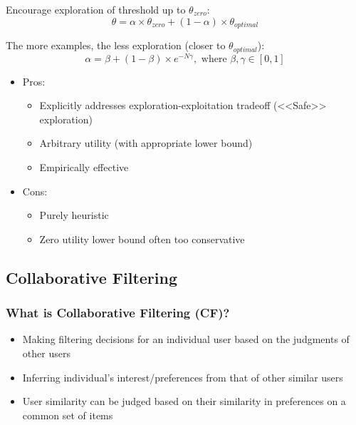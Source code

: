 Encourage exploration of threshold up to $\theta_{zero}$:
\begin{equation*}
\theta = \alpha \times \theta_{zero} + (1-\alpha) \times \theta_{optimal}
\end{equation*}

The more examples, the less exploration (closer to $\theta_{optimal}$):
\begin{equation*}
\alpha = \beta + (1-\beta) \times e^{-N\gamma}, \text{ where }\beta,\gamma \in [0, 1]
\end{equation*}

\begin{itemize}
\item Pros:
\begin{itemize}
\item Explicitly addresses exploration-exploitation tradeoff (<<Safe>>
exploration)
\item Arbitrary utility (with appropriate lower bound)
\item Empirically effective
\end{itemize}

\item Cons:
\begin{itemize}
\item Purely heuristic
\item Zero utility lower bound often too conservative
\end{itemize}
\end{itemize}



\subsection{Collaborative Filtering}

\subsubsection{What is Collaborative Filtering (CF)?}
\begin{itemize}
\item Making filtering decisions for an individual user based on the judgments of other users
\item Inferring individual’s interest/preferences from that of other similar users
\item User similarity can be judged based on their similarity in preferences on a common set of items
\end{itemize}

